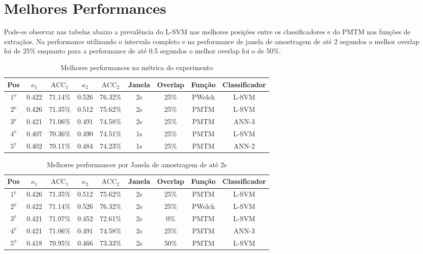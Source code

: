 \section{Melhores Performances}
\par Pode-se observar nas tabelas abaixo a preval\^encia do \ac{L-SVM} nas melhores posi\c{c}\~oes entre os classificadores e do \ac{PMTM} nas fun\c{c}\~oes de extra\c{c}\~aos. Na performance utilizando o intervalo completo e na performance de janela de amostragem de at\'e 2 segundos o melhor overlap foi de 25\% enquanto para a performance de at\'e 0.5 segundos o melhor overlap foi o de 50\%.
\begin{table}[h!]
	\centering
	\caption{Melhores performances na m\'etrica do experimento}
	\begin{tabularx}{\textwidth}{c|c|c|c|c|c|c|c|c}		
		\hline\hline
		Pos&$\kappa_1$ &$\text{ACC}_1$&$\kappa_2$&$\text{ACC}_2$&Janela& Overlap&Fun\c{c}\~ao&Classificador  \\ \hline 
		$1^{\underline{o}}$&0.422&71.14\%&0.526&76.32\%&2s&25\%&PWelch&\acs{L-SVM} \\ \hline 
		$2^{\underline{o}}$&0.426&71.35\%&0.512&75.62\%&2s&25\%&PMTM&L-SVM \\ \hline
		$3^{\underline{o}}$&0.421&71.06\%&0.491&74.58\%&2s&25\%&PMTM&\acs{ANN-3} \\ \hline
		$4^{\underline{o}}$&0.407&70.36\%&0.490&74.51\%&1s&25\%&PMTM&L-SVM \\ \hline
		$5^{\underline{o}}$&0.402&70.11\%&0.484&74.23\%&1s&25\%&PMTM&\ac{ANN-2} \\ \hline
	\end{tabularx}
	\label{Tab:melhoresKappaFull}
\end{table}

\begin{table}[h!]
	\centering
	\caption{Melhores performances por Janela de amostragem de at\'e 2s}
	\begin{tabularx}{\textwidth}{c|c|c|c|c|c|c|c|c}		
		\hline\hline
		Pos&$\kappa_1$ &$\text{ACC}_1$&$\kappa_2$&$\text{ACC}_2$&Janela& Overlap&Fun\c{c}\~ao&Classificador  \\ \hline
		$1^{\underline{o}}$&0.426&71.35\%&0.512&75.62\%&2s&25\%&PMTM&L-SVM \\ \hline 
		$2^{\underline{o}}$&0.422&71.14\%&0.526&76.32\%&2s&25\%&PWelch&L-SVM\\ \hline
		$3^{\underline{o}}$&0.421&71.07\%&0.452&72.61\%&2s&0\%&PMTM&L-SVM \\ \hline
		$4^{\underline{o}}$&0.421&71.06\%&0.491&74.58\%&2s&25\%&PMTM&ANN-3 \\ \hline
		$5^{\underline{o}}$&0.418&70.95\%&0.466&73.33\%&2s&50\%&PMTM&L-SVM \\ \hline
	\end{tabularx}
	\label{Tab:melhoresKappa}
\end{table}

